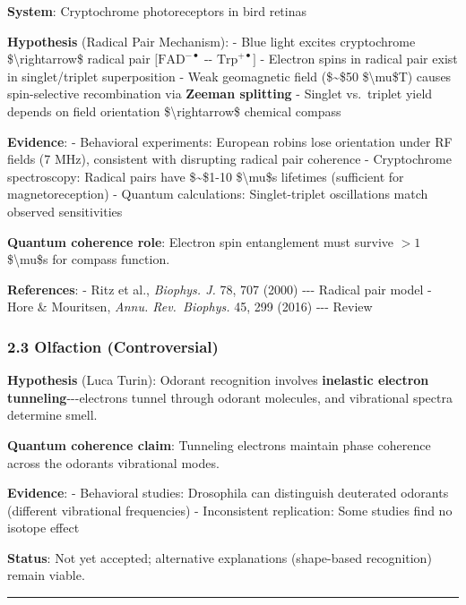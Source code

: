 \textbf{System}: Cryptochrome photoreceptors in bird retinas

\textbf{Hypothesis} (Radical Pair Mechanism): - Blue light excites
cryptochrome \$\textbackslash rightarrow\$ radical pair
\([\text{FAD}^{-•}\) -\/- \(\text{Trp}^{+•}]\) - Electron spins in
radical pair exist in singlet/triplet superposition - Weak geomagnetic
field (\$\sim\$50 \$\textbackslash mu\$T) causes spin-selective
recombination via \textbf{Zeeman splitting} - Singlet vs.~triplet yield
depends on field orientation \$\textbackslash rightarrow\$ chemical
compass

\textbf{Evidence}: - Behavioral experiments: European robins lose
orientation under RF fields (7 MHz), consistent with disrupting radical
pair coherence - Cryptochrome spectroscopy: Radical pairs have
\$\sim\$1-10 \$\textbackslash mu\$s lifetimes (sufficient for
magnetoreception) - Quantum calculations: Singlet-triplet oscillations
match observed sensitivities

\textbf{Quantum coherence role}: Electron spin entanglement must survive
\(>1\) \$\textbackslash mu\$s for compass function.

\textbf{References}: - Ritz et al., \emph{Biophys. J.} 78, 707 (2000)
-\/-\/- Radical pair model - Hore \& Mouritsen, \emph{Annu.
Rev.~Biophys.} 45, 299 (2016) -\/-\/- Review

\subsubsection{\texorpdfstring{2.3 Olfaction
(Controversial)}{2.3 Olfaction  (Controversial)}}\label{olfaction-controversial}

\textbf{Hypothesis} (Luca Turin): Odorant recognition involves
\textbf{inelastic electron tunneling}-\/-\/-electrons tunnel through
odorant molecules, and vibrational spectra determine smell.

\textbf{Quantum coherence claim}: Tunneling electrons maintain phase
coherence across the odorant\textquotesingle s vibrational modes.

\textbf{Evidence}: - Behavioral studies: Drosophila can distinguish
deuterated odorants (different vibrational frequencies) - Inconsistent
replication: Some studies find no isotope effect

\textbf{Status}: Not yet accepted; alternative explanations (shape-based
recognition) remain viable.

\begin{center}\rule{0.5\linewidth}{0.5pt}\end{center}

